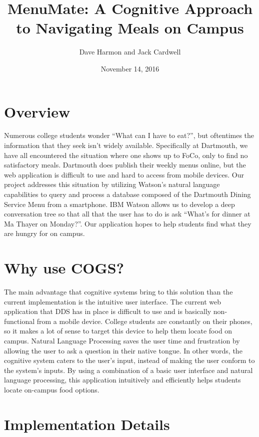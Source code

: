 \documentclass [12pt] {article}
\begin{document}
\title{\textbf{MenuMate: A Cognitive Approach to Navigating Meals on Campus}}
\author{Dave Harmon and Jack Cardwell}
\date{November 14, 2016}
\maketitle

\pagebreak

\section{Overview}

Numerous college students wonder ``What can I have to eat?'', but oftentimes the information that they seek isn't widely available. Specifically at Dartmouth, we have all encountered the situation where one shows up to FoCo, only to find no satisfactory meals. Dartmouth does publish their weekly menus online, but the web application is difficult to use and hard to access from mobile devices. Our project addresses this situation by utilizing Watson's natural language capabilities to query and process a database composed of the Dartmouth Dining Service Menu from a smartphone. IBM Watson allows us to develop a deep conversation tree so that all that the user has to do is ask ``What's for dinner at Ma Thayer on Monday?''. Our application hopes to help students find what they are hungry for on campus.

\section{Why use COGS?}

The main advantage that cognitive systems bring to this solution than the current implementation is the intuitive user interface. The current web application that DDS has in place is difficult to use and is basically non-functional from a mobile device. College students are constantly on their phones, so it makes a lot of sense to target this device to help them locate food on campus. Natural Language Processing saves the user time and frustration by allowing the user to ask a question in their native tongue. In other words, the cognitive system caters to the user's input, instead of making the user conform to the system's inputs. By using a combination of a basic user interface and natural language processing, this application intuitively and efficiently helps students locate on-campus food options.

\section{Implementation Details}
\end{document}

